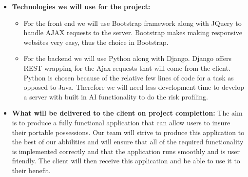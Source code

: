 \documentclass{article}
\begin{document}
\begin{itemize}
		\item \textbf{Technologies we will use for the project:}
		\begin{itemize}
			\item For the front end we will use Bootstrap framework along with JQuery to handle AJAX requests to the server. Bootstrap makes making responsive websites very easy, thus the choice in Bootstrap.
			\item For the backend we will use Python along with Django. Django offers REST wrapping for the Ajax requests that will come from the client. Python is chosen because of the relative few lines of code for a task as opposed to Java. Therefore we will need less development time to develop a server with built in AI functionality to do the risk profiling.			
		\end{itemize}
		
		\item \textbf{What will be delivered to the client on project completion:} \newline \newline
		The aim is to produce a fully functional application that can allow users to insure their portable possessions. Our team will strive to produce this application to the best of our abbilities and will ensure that all of the required functionality is implemented correctly and that the application runs smoothly and is user friendly. The client will then receive this application and be able to use it to their benefit.
	\end{itemize}
\end{document}

